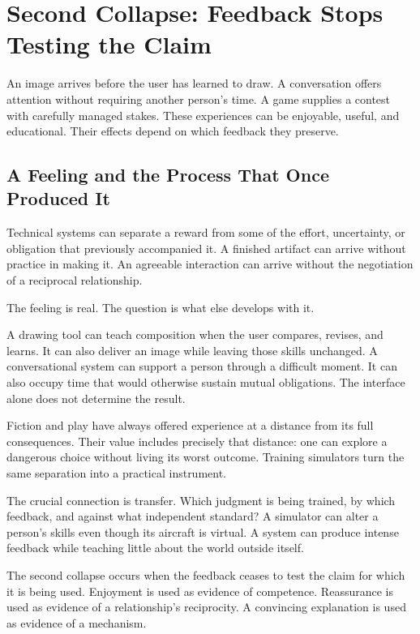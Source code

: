 \section{Second Collapse: Feedback Stops Testing the Claim}

An image arrives before the user has learned to draw. A conversation offers attention without requiring another person's time. A game supplies a contest with carefully managed stakes. These experiences can be enjoyable, useful, and educational. Their effects depend on which feedback they preserve.

\subsection{A Feeling and the Process That Once Produced It}

Technical systems can separate a reward from some of the effort, uncertainty, or obligation that previously accompanied it. A finished artifact can arrive without practice in making it. An agreeable interaction can arrive without the negotiation of a reciprocal relationship.

The feeling is real. The question is what else develops with it.

A drawing tool can teach composition when the user compares, revises, and learns. It can also deliver an image while leaving those skills unchanged. A conversational system can support a person through a difficult moment. It can also occupy time that would otherwise sustain mutual obligations. The interface alone does not determine the result.

Fiction and play have always offered experience at a distance from its full consequences. Their value includes precisely that distance: one can explore a dangerous choice without living its worst outcome. Training simulators turn the same separation into a practical instrument.

The crucial connection is transfer. Which judgment is being trained, by which feedback, and against what independent standard? A simulator can alter a person's skills even though its aircraft is virtual. A system can produce intense feedback while teaching little about the world outside itself.

The second collapse occurs when the feedback ceases to test the claim for which it is being used. Enjoyment is used as evidence of competence. Reassurance is used as evidence of a relationship's reciprocity. A convincing explanation is used as evidence of a mechanism.

